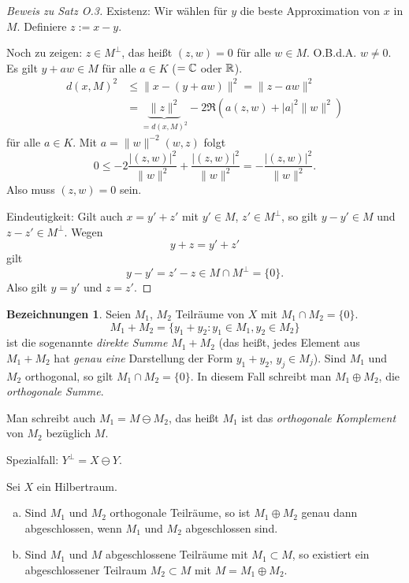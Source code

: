 \documentclass[
 a4paper,
 12pt,
 parskip=half
 ]{scrreprt}
\theoremstyle{plain}
\theoremstyle{definition}
\newtheorem*{denos*}{Bezeichnungen}
\numberwithin{equation}{section}
\begin{document}
\begin{proof}[Beweis zu Satz O.3]
  Existenz: Wir wählen für $y$ die beste Approximation von $x$ in $M$. Definiere
  $z := x - y$.

  Noch zu zeigen: $z \in M^\perp$, das heißt $(z,w) = 0$ für alle $w \in M$.
  O.B.d.A. $w \ne 0$. Es gilt $y + aw \in M$ für alle $a \in K$ ($=\mathbb{C}$
  oder $\mathbb{R}$).
  \begin{align*}
    d(x,M)^2
    &\le \| x - (y+aw) \|^2 = \| z - aw \|^2 \\
    &= \underbrace{\| z \|^2}_{=d(x,M)^2} - 2 \Re( a(z,w) + |a|^2 \|w\|^2 )
  \end{align*}
  für alle $a \in K$. Mit $a = \| w \|^{-2} (w,z)$ folgt
  \[ 0 \le -2 \frac{|(z,w)|^2}{\|w\|^2} + \frac{|(z,w)|^2}{\|w\|^2}
    = - \frac{|(z,w)|^2}{\|w\|^2}. \]
  Also muss $(z,w) = 0$ sein.

  Eindeutigkeit: Gilt auch $x = y' + z'$ mit $y' \in M$, $z' \in M^\perp$, so
  gilt $y - y' \in M$ und $z - z' \in M^\perp$. Wegen
  \[ y + z = y' + z' \]
  gilt
  \[ y - y' = z' - z \in M \cap M^\perp = \{ 0 \}. \]
  Also gilt $y = y'$ und $z = z'$.
\end{proof}

\begin{denos*}
  Seien $M_1$, $M_2$ Teilräume von $X$ mit $M_1 \cap M_2 = \{ 0 \}$.
  \[ M_1 + M_2 = \{ y_1 + y_2 : y_1 \in M_1, y_2 \in M_2 \} \]
  ist die sogenannte \emph{direkte Summe} $M_1 + M_2$ (das heißt, jedes Element
  aus $M_1 + M_2$ hat \emph{genau eine} Darstellung der Form $y_1 + y_2$, $y_j
  \in M_j$).
  Sind $M_1$ und $M_2$ orthogonal, so gilt $M_1 \cap M_2 = \{0\}$. In diesem
  Fall schreibt man $M_1 \oplus M_2$, die \emph{orthogonale Summe}.

  Man schreibt auch $M_1 = M \ominus M_2$, das heißt $M_1$ ist das
  \emph{orthogonale Komplement} von $M_2$ bezüglich $M$.

  Spezialfall: $Y^\perp = X \ominus Y$.
\end{denos*}

\clearpage

\begin{thm}
  Sei $X$ ein Hilbertraum.
  \begin{enumerate}[a)]
  \item Sind $M_1$ und $M_2$ orthogonale Teilräume, so ist $M_1 \oplus M_2$
    genau dann abgeschlossen, wenn $M_1$ und $M_2$ abgeschlossen sind.
  \item Sind $M_1$ und $M$ abgeschlossene Teilräume mit $M_1 \subset M$, so
    existiert ein abgeschlossener Teilraum $M_2 \subset M$ mit $M = M_1 \oplus
    M_2$. 
  \end{enumerate}
\end{thm}
\end{document}
